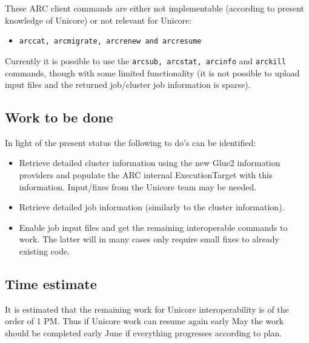 \documentclass[11pt,oneside,a4paper,english]{article}
\begin{document}
These ARC client commands are either not implementable (according to present knowledge of Unicore) or not relevant for Unicore:
\begin{itemize}
\item{\texttt{arccat, arcmigrate, arcrenew and arcresume}}
\end{itemize}

Currently it is possible to use the \texttt{arcsub, arcstat, arcinfo} and \texttt{arckill} commands, though with some limited functionality (it is not possible to upload input files and the returned job/cluster job information is sparse). 

\subsection*{Work to be done}
In light of the present status the following to do's can be identified:

\begin{itemize}
\item{Retrieve detailed cluster information using the new Glue2 information providers and populate the ARC internal ExecutionTarget with this information. Input/fixes from the Unicore team may be needed.}
\item{Retrieve detailed job information (similarly to the cluster information).}
\item{Enable job input files and get the remaining interoperable commands to work. The latter will in many cases only require small fixes to already existing code.}
\end{itemize}
\subsection*{Time estimate}
It is estimated that the remaining work for Unicore interoperability is of the order of 1 PM. Thus if Unicore work can resume again early May the work should be completed early June if everything progresses according to plan.
\end{document}
